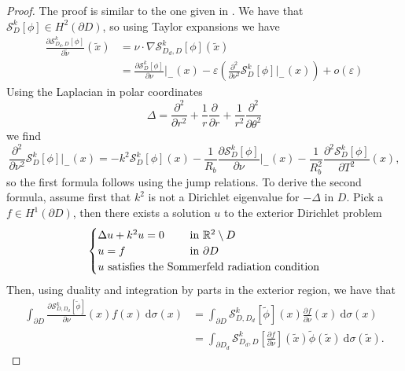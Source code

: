 \documentclass[a4paper]{article}
\theoremstyle{definition}
\newcommand{\R}{\mathbb{R}}
\renewcommand{\S}{\mathcal{S}}
\renewcommand{\epsilon}{\varepsilon}
\newcommand{\dx}{\: \mathrm{d}}
\begin{document}
\begin{proof}
The proof is similar to the one given in \cite{asymptoticsderivative}. We have that $\S_D^k[\phi]\in H^2(\partial D)$, so using Taylor expansions we have
\begin{align*}
\frac{\partial \S_{D_d,D}^k[\phi]}{\partial \tilde{\nu}} (\tilde{x}) &= \nu \cdot \nabla \S_{D_d,D}^k[\phi](\tilde{x}) \\
&= \frac{\partial \S_D^k[\phi]}{\partial \nu} \bigg|_{-}(x) - \epsilon\left(\frac{\partial^2}{\partial \nu^2}\S_D^k[\phi]\bigg|_{-}(x) \right) + o(\epsilon)
\end{align*}
Using the Laplacian in polar coordinates
\begin{equation*}
\Delta = \frac{\partial^2}{\partial r^2} + \frac{1}{r}\frac{\partial}{\partial r} + \frac{1}{r^2}\frac{\partial^2}{\partial \theta^2}
\end{equation*}
we find 
\begin{equation*}
\frac{\partial^2}{\partial \nu^2}\S_D^k[\phi]\bigg|_{-}(x) = -k^2\S_D^k[\phi](x) -\frac{1}{R_b}\frac{\partial \S_D^k[\phi]}{\partial \nu}\bigg|_{-}(x) - \frac{1}{R_b^2}\frac{\partial^2 \S_D^k[\phi]}{\partial T^2}(x),
\end{equation*}
so the first formula follows using the jump relations. To derive the second formula, assume first that $k^2$ is not a Dirichlet eigenvalue for $-\Delta$ in $D$. Pick a $f\in H^1(\partial D)$, then there exists a solution $u$ to the exterior Dirichlet problem
\begin{equation*}
\begin{cases}
\Delta u + k^2 u = 0 \quad &\text{in } \R^2\setminus D \\
u = f & \text{in } \partial D \\
u \text{ satisfies the So} &\hspace{-10pt}\text{mmerfeld radiation condition}
\end{cases}
\end{equation*}
Then, using duality and  integration by parts in the exterior region, we have that
\begin{align*}
\int_{\partial D} \frac{\partial \S_{D,D_d}^k[\tilde{\phi}]}{\partial \nu} (x) f(x) \dx \sigma(x) &= \int_{\partial D} \S_{D,D_d}^k[\tilde{\phi}](x)\frac{\partial f }{\partial \nu} (x)  \dx \sigma(x) \\
&= \int_{\partial D_d} \S_{D_d,D}^k\left[\frac{\partial f }{\partial \nu}\right](\tilde{x})\tilde{\phi}(\tilde{x}) \dx \sigma(\tilde{x}).
\end{align*}

\end{proof}
\end{document}
